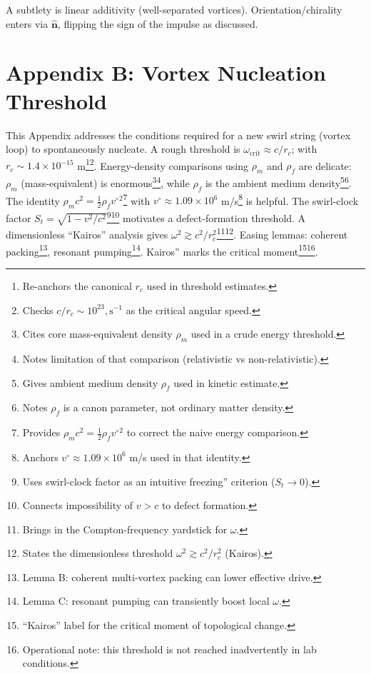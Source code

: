 \documentclass[12pt]{article}
\begin{document}
A subtlety is linear additivity (well-separated vortices). Orientation/chirality enters via $\hat{\mathbf n}$, flipping the sign of the impulse as discussed.




\section*{Appendix B: Vortex Nucleation Threshold}\label{app:Threshold}

This Appendix addresses the conditions required for a new swirl string (vortex loop) to spontaneously nucleate. A rough threshold is $\omega_{\text{crit}}\approx c/r_c$; with $r_c \sim 1.4\times10^{-15}$ m\footnote{Re-anchors the canonical $r_c$ used in threshold estimates.}\footnote{Checks $c/r_c\sim10^{23},\mathrm{s^{-1}}$ as the critical angular speed.}. Energy-density comparisons using $\rho_m$ and $\rho_f$ are delicate: $\rho_m$ (mass-equivalent) is enormous\footnote{Cites core mass-equivalent density $\rho_m$ used in a crude energy threshold.}\footnote{Notes limitation of that comparison (relativistic vs non-relativistic).}, while $\rho_f$ is the ambient medium density\footnote{Gives ambient medium density $\rho_f$ used in kinetic estimate.}\footnote{Notes $\rho_f$ is a canon parameter, not ordinary matter density.}. The identity $\rho_m c^2=\tfrac12\rho_f {v^\circ}^2$\footnote{Provides $\rho_m c^2=\frac12\rho_f {v^\circ}^2$ to correct the naive energy comparison.} with $v^\circ\approx1.09\times10^6$ m/s\footnote{Anchors $v^\circ\approx 1.09\times10^6$ m/s used in that identity.} is helpful. The swirl-clock factor $S_t=\sqrt{1-v^2/c^2}$\footnote{Uses swirl-clock factor as an intuitive freezing'' criterion ($S_t\to 0$).}\footnote{Connects impossibility of $v>c$ to defect formation.} motivates a defect-formation threshold. A dimensionless “Kairos” analysis gives $\omega^2\gtrsim c^2/r_c^2$\footnote{Brings in the Compton-frequency yardstick for $\omega$.}\footnote{States the dimensionless threshold $\omega^2\gtrsim c^2/r_c^2$ (Kairos).}. Easing lemmas: coherent packing\footnote{Lemma B: coherent multi-vortex packing can lower effective drive.}, resonant pumping\footnote{Lemma C: resonant pumping can transiently boost local $\omega$.}. Kairos'' marks the critical moment\footnote{``Kairos'' label for the critical moment of topological change.}\footnote{Operational note: this threshold is not reached inadvertently in lab conditions.}.
\end{document}
